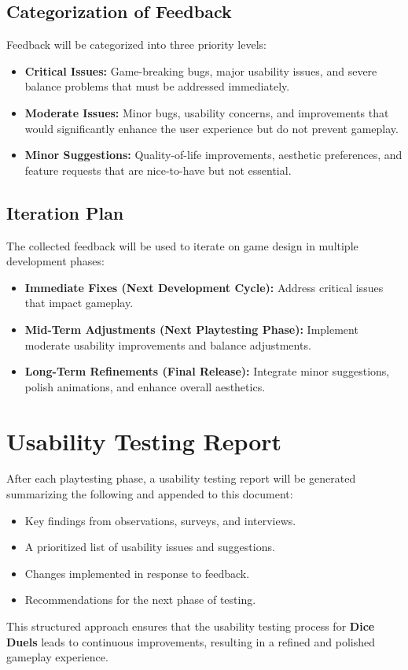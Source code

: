 \documentclass{article}
\begin{document}
\subsection{Categorization of Feedback}
Feedback will be categorized into three priority levels:
\begin{itemize}
    \item \textbf{Critical Issues:} Game-breaking bugs, major usability issues, and severe balance problems that must be addressed immediately.
    \item \textbf{Moderate Issues:} Minor bugs, usability concerns, and improvements that would significantly enhance the user experience but do not prevent gameplay.
    \item \textbf{Minor Suggestions:} Quality-of-life improvements, aesthetic preferences, and feature requests that are nice-to-have but not essential.
\end{itemize}

\subsection{Iteration Plan}
The collected feedback will be used to iterate on game design in multiple development phases:
\begin{itemize}
    \item \textbf{Immediate Fixes (Next Development Cycle):} Address critical issues that impact gameplay.
    \item \textbf{Mid-Term Adjustments (Next Playtesting Phase):} Implement moderate usability improvements and balance adjustments.
    \item \textbf{Long-Term Refinements (Final Release):} Integrate minor suggestions, polish animations, and enhance overall aesthetics.
\end{itemize}

\newpage

\section{Usability Testing Report}
After each playtesting phase, a usability testing report will be generated summarizing the following and appended to this document:
\begin{itemize}
    \item Key findings from observations, surveys, and interviews.
    \item A prioritized list of usability issues and suggestions.
    \item Changes implemented in response to feedback.
    \item Recommendations for the next phase of testing.
\end{itemize}

This structured approach ensures that the usability testing process for \textbf{Dice Duels} leads to continuous improvements, resulting in a refined and polished gameplay experience.
\end{document}
